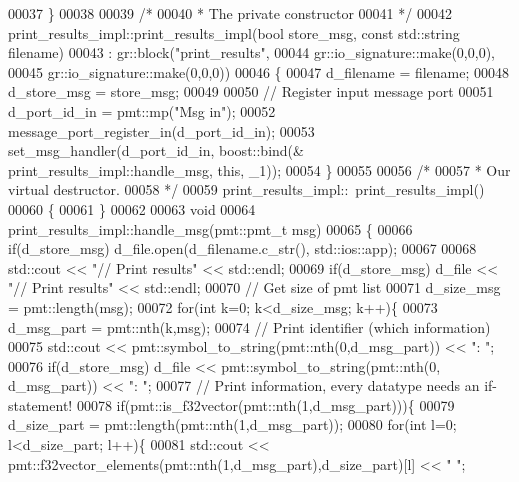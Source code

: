 \begin{DoxyCode}
00037     \}
00038 
00039     \textcolor{comment}{/*}
00040 \textcolor{comment}{     * The private constructor}
00041 \textcolor{comment}{     */}
00042     print_results_impl::print_results_impl(\textcolor{keywordtype}{bool} store\_msg, \textcolor{keyword}{const} std::string 
      filename)
00043       : gr::block(\textcolor{stringliteral}{"print\_results"},
00044               gr::io\_signature::make(0,0,0),
00045               gr::io\_signature::make(0,0,0))
00046     \{
00047         d_filename = filename;
00048         d_store_msg = store\_msg;
00049         
00050         \textcolor{comment}{// Register input message port}
00051         d_port_id_in = pmt::mp(\textcolor{stringliteral}{"Msg in"});
00052         message\_port\_register\_in(d_port_id_in);
00053         set\_msg\_handler(d_port_id_in, boost::bind(&
      print_results_impl::handle_msg, \textcolor{keyword}{this}, \_1));
00054     \}
00055 
00056     \textcolor{comment}{/*}
00057 \textcolor{comment}{     * Our virtual destructor.}
00058 \textcolor{comment}{     */}
00059     print_results_impl::~print_results_impl()
00060     \{
00061     \}
00062     
00063     \textcolor{keywordtype}{void}
00064     print_results_impl::handle_msg(pmt::pmt\_t msg)
00065     \{
00066         \textcolor{keywordflow}{if}(d_store_msg) d_file.open(d_filename.c\_str(), std::ios::app);
00067         
00068         std::cout << \textcolor{stringliteral}{"// Print results"} << std::endl;
00069         \textcolor{keywordflow}{if}(d_store_msg) d_file << \textcolor{stringliteral}{"// Print results"} << std::endl;
00070         \textcolor{comment}{// Get size of pmt list}
00071         d_size_msg = pmt::length(msg);
00072         \textcolor{keywordflow}{for}(\textcolor{keywordtype}{int} k=0; k<d_size_msg; k++)\{
00073             d_msg_part = pmt::nth(k,msg);
00074             \textcolor{comment}{// Print identifier (which information)}
00075             std::cout << pmt::symbol\_to\_string(pmt::nth(0,d_msg_part)) << \textcolor{stringliteral}{": "};
00076             \textcolor{keywordflow}{if}(d_store_msg) d_file << pmt::symbol\_to\_string(pmt::nth(0,
      d_msg_part)) << \textcolor{stringliteral}{": "};
00077             \textcolor{comment}{// Print information, every datatype needs an if-statement!}
00078             \textcolor{keywordflow}{if}(pmt::is\_f32vector(pmt::nth(1,d_msg_part)))\{
00079                 d_size_part = pmt::length(pmt::nth(1,d_msg_part));
00080                 \textcolor{keywordflow}{for}(\textcolor{keywordtype}{int} l=0; l<d_size_part; l++)\{
00081                     std::cout << pmt::f32vector\_elements(pmt::nth(1,d_msg_part),d\_size\_part)[l] << \textcolor{stringliteral}{" "};

\end{DoxyCode}
